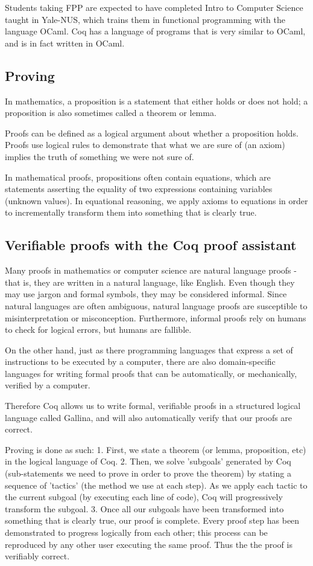 Students taking FPP are expected to have completed Intro to Computer Science taught in Yale-NUS, which trains them in functional programming with the language OCaml. Coq has a language of programs that is very similar to OCaml, and is in fact written in OCaml. 

\subsection{Proving}
In mathematics, a proposition is a statement that either holds or does not hold; a proposition is also sometimes called a theorem or lemma. 

Proofs can be defined as a logical argument about whether a proposition holds. Proofs use logical rules to demonstrate that what we are sure of (an axiom) implies the truth of something we were not sure of. 

In mathematical proofs, propositions often contain equations, which are statements asserting the equality of two expressions containing variables (unknown values). In equational reasoning, we apply axioms to equations in order to incrementally transform them into something that is clearly true. 

\subsection{Verifiable proofs with the Coq proof assistant}
Many proofs in mathematics or computer science are natural language proofs - that is, they are written in a natural language, like English. Even though they may use jargon and formal symbols, they may be considered informal. Since natural languages are often ambiguous, natural language proofs are susceptible to misinterpretation or misconception. Furthermore, informal proofs rely on humans to check for logical errors, but humans are fallible.

On the other hand, just as there programming languages that express a set of instructions to be executed by a computer, there are also domain-specific languages for writing formal proofs that can be automatically, or mechanically, verified by a computer. 

Therefore Coq allows us to write formal, verifiable proofs in a structured logical language called Gallina, and will also automatically verify that our proofs are correct. 

Proving is done as such: 
1. First, we state a theorem (or lemma, proposition, etc) in the logical language of Coq. 
2. Then, we solve 'subgoals'  generated by Coq (sub-statements we need to prove in order to prove the theorem) by stating a sequence of 'tactics' (the method we use at each step). As we apply each tactic to the current subgoal (by executing each line of code), Coq will progressively transform the subgoal.
3. Once all our subgoals have been transformed into something that is clearly true, our proof is complete. Every proof step has been demonstrated to progress logically from each other; this process can be reproduced by any other user executing the same proof. Thus the the proof is verifiably correct. 


